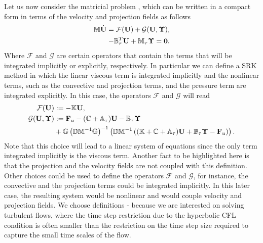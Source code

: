 Let us now consider the matricial problem , which can be written in a compact form in terms of the velocity and projection fields as follows
\begin{subequations}\label{eq-C7_SRK_ueta}
\begin{align}
\label{eq-C7_SRK_u}
\mathbb{M}\dot{{\bf U}}=\mathcal{F}({\bf U})+\mathcal{G}({\bf U},\boldsymbol{\Upsilon}),\\
\label{eq-C7_SRK_eta}
-\mathbb{B}_\tau^T{\bf U}+\mathbb{M}_\tau\boldsymbol{\Upsilon}=\mathbf{0}.
\end{align}
\end{subequations}
Where $\mathcal{F}$ and $\mathcal{G}$ are certain operators that contain the terms that will be integrated implicitly or explicitly, respectively. In particular we can define a SRK method in which the linear viscous term is integrated implicitly and the nonlinear terms, such as the convective and projection terms, and the pressure term are integrated explicitly. In this case, the operators $\mathcal{F}$ and $\mathcal{G}$ will read
\begin{align}
\label{eq-C7_SRK_F}
\mathcal{F}({\bf U})&:=-\mathbb{K}{\bf U},\\
\label{eq-C7_SRK_G}
\mathcal{G}({\bf U},\boldsymbol{\Upsilon})&:={\bf F}_u-(\mathbb{C}+\mathbb{A}_\tau){\bf U}-\mathbb{B}_\tau\boldsymbol{\Upsilon}\\\nonumber
&+\mathbb{G}\left(\mathbb{D}\mathbb{M}^{-1}\mathbb{G}\right)^{-1}\left(\mathbb{D}\mathbb{M}^{-1}\left((\mathbb{K}+\mathbb{C}+\mathbb{A}_\tau){\bf U}+\mathbb{B}_\tau\boldsymbol{\Upsilon}-{\bf F}_u\right)\right).
\end{align}
Note that this choice will lead to a linear system of equations since the only term integrated implicitly is the viscous term. Another fact to be highlighted here is that the projection and the velocity fields are not coupled with this definition. Other choices could be used to define the operators $\mathcal{F}$ and $\mathcal{G}$, for instance, the convective and the projection terms could be integrated implicitly. In this later case, the resulting system would be nonlinear and would couple velocity and projection fields. We choose definitions - because we are interested on solving turbulent flows, where the time step restriction due to the hyperbolic CFL condition is often smaller than the restriction on the time step size required to capture the small time scales of the flow.

